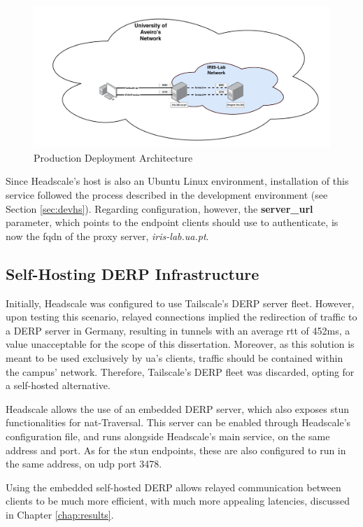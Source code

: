 \documentclass[11pt,twoside,a4paper]{report}
\begin{document}
\begin{figure}[h]
\centering
\includegraphics[width=\textwidth]{prod.png}
\caption{Production Deployment Architecture}
\label{fig:prodsolution}
\end{figure}

Since Headscale's host is also an Ubuntu Linux environment, installation of this service followed the process described in the development environment (see Section \ref{sec:devhs}). Regarding configuration, however, the \textbf{server\_url} parameter, which points to the endpoint clients should use to authenticate, is now the \ac{fqdn} of the proxy server, \emph{iris-lab.ua.pt}.

\subsection{Self-Hosting DERP Infrastructure}

Initially, Headscale was configured to use Tailscale's \ac{DERP} server fleet. However, upon testing this scenario, relayed connections implied the redirection of traffic to a \ac{DERP} server in Germany, resulting in tunnels with an average \ac{rtt} of 452ms, a value unacceptable for the scope of this dissertation. Moreover, as this solution is meant to be used exclusively by \ac{ua}'s clients, traffic should be contained within the campus' network. Therefore, Tailscale's \ac{DERP} fleet was discarded, opting for a self-hosted alternative.

Headscale allows the use of an embedded \ac{DERP} server, which also exposes \ac{stun} functionalities for \ac{nat}-Traversal. This server can be enabled through Headscale's configuration file, and runs alongside Headscale's main service, on the same address and port. As for the \ac{stun} endpoints, these are also configured to run in the same address, on \ac{udp} port 3478.

Using the embedded self-hosted \ac{DERP} allows relayed communication between clients to be much more efficient, with much more appealing latencies, discussed in Chapter \ref{chap:results}.
\end{document}
